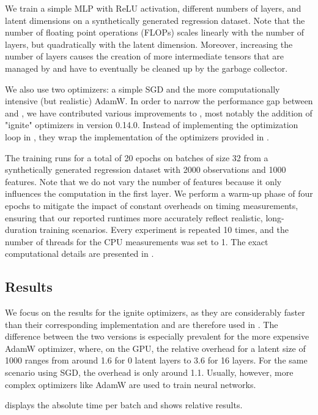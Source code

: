\documentclass[article]{jss}
\theoremstyle{definition}
\begin{document}
We train a simple MLP with ReLU activation, different numbers of layers, and latent dimensions on a synthetically generated regression dataset.
Note that the number of floating point operations (FLOPs) scales linearly with the number of layers, but quadratically with the latent dimension.
Moreover, increasing the number of layers causes the creation of more intermediate tensors that are managed by \rlang{} and have to eventually be cleaned up by the \rlang{} garbage collector.

We also use two optimizers: a simple SGD and the more computationally intensive (but realistic) AdamW.
In order to narrow the performance gap between \torch{} and \pytorch{}, we have contributed various improvements to \torch{}, most notably the addition of "ignite" optimizers in \torch{} version 0.14.0.
Instead of implementing the optimization loop in \rlang{}, they wrap the \cpp{} implementation of the optimizers provided in \libtorch{}.

The training runs for a total of 20 epochs on batches of size 32 from a synthetically generated regression dataset with 2000 observations and 1000 features.
Note that we do not vary the number of features because it only influences the computation in the first layer.
We perform a warm-up phase of four epochs to mitigate the impact of constant overheads on timing measurements, ensuring that our reported runtimes more accurately reflect realistic, long-duration training scenarios.
Every experiment is repeated 10 times, and the number of threads for the CPU measurements was set to 1.
The exact computational details are presented in .

\subsection{Results}

We focus on the results for the ignite optimizers, as they are considerably faster than their corresponding \rlang{} implementation and are therefore used in \mlrttorch{}.
The difference between the two versions is especially prevalent for the more expensive AdamW optimizer, where, on the GPU, the relative overhead for a latent size of 1000 ranges from around 1.6 for 0 latent layers to 3.6 for 16 layers.
For the same scenario using SGD, the overhead is only around 1.1.
Usually, however, more complex optimizers like AdamW are used to train neural networks.

 displays the absolute time per batch and  shows relative results.
\end{document}
